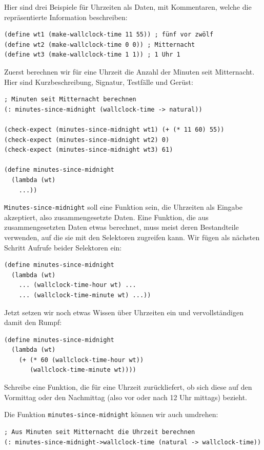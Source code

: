 Hier sind drei Beispiele für Uhrzeiten als Daten, mit Kommentaren,
welche die repräsentierte Information beschreiben:
%
\begin{lstlisting}
(define wt1 (make-wallclock-time 11 55)) ; fünf vor zwölf
(define wt2 (make-wallclock-time 0 0)) ; Mitternacht
(define wt3 (make-wallclock-time 1 1)) ; 1 Uhr 1
\end{lstlisting}
%
Zuerst berechnen wir für eine Uhrzeit die Anzahl der Minuten
seit Mitternacht.  Hier sind Kurzbeschreibung, Signatur, Testfälle und Gerüst:
%
\begin{lstlisting}
; Minuten seit Mitternacht berechnen
(: minutes-since-midnight (wallclock-time -> natural))

(check-expect (minutes-since-midnight wt1) (+ (* 11 60) 55))
(check-expect (minutes-since-midnight wt2) 0)
(check-expect (minutes-since-midnight wt3) 61)

(define minutes-since-midnight
  (lambda (wt)
    ...))
\end{lstlisting}
%
\lstinline{Minutes-since-midnight} soll eine Funktion sein, die
Uhrzeiten als Eingabe akzeptiert, also zusammengesetzte Daten.  Eine
Funktion, die aus zusammengesetzten Daten etwas berechnet, muss meist
deren Bestandteile verwenden, auf die sie mit den Selektoren zugreifen
kann.  Wir fügen als nächsten Schritt Aufrufe beider Selektoren ein:
%
\begin{lstlisting}
(define minutes-since-midnight
  (lambda (wt)
    ... (wallclock-time-hour wt) ...
    ... (wallclock-time-minute wt) ...))
\end{lstlisting}
%
Jetzt setzen wir noch etwas Wissen über Uhrzeiten ein und
vervollständigen damit den Rumpf:
%
\begin{lstlisting}
(define minutes-since-midnight
  (lambda (wt)
    (+ (* 60 (wallclock-time-hour wt))
       (wallclock-time-minute wt))))
\end{lstlisting}
%
\begin{aufgabeinline}
  Schreibe eine Funktion, die für eine Uhrzeit zurückliefert, ob sich
  diese auf den Vormittag oder den Nachmittag (also vor oder nach 12 Uhr
  mittags) bezieht.
\end{aufgabeinline}
%
Die Funktion \lstinline{minutes-since-midnight} können wir auch umdrehen:
%
\begin{lstlisting}
; Aus Minuten seit Mitternacht die Uhrzeit berechnen
(: minutes-since-midnight->wallclock-time (natural -> wallclock-time))
\end{lstlisting}
